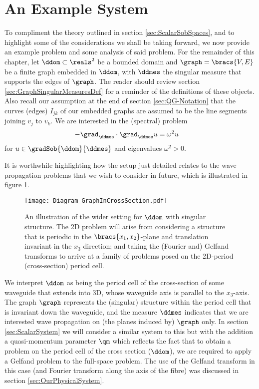 \section{An Example System} \label{sec:ScalarExample}
To compliment the theory outlined in section \ref{sec:ScalarSobSpaces}, and to highlight some of the considerations we shall be taking forward, we now provide an example problem and some analysis of said problem.
For the remainder of this chapter, let $\ddom\subset\reals^2$ be a bounded domain and $\graph = \bracs{V,E}$ be a finite graph embedded in $\ddom$, with $\ddmes$ the singular measure that supports the edges of $\graph$.
The reader should review section \ref{sec:GraphSingularMeasuresDef} for a reminder of the definitions of these objects.
Also recall our assumption at the end of section \ref{sec:QG-Notation} that the curves (edges) $I_{jk}$ of our embedded graphs are assumed to be the line segments joining $v_j$ to $v_k$.
We are interested in the (spectral) problem
\begin{align} \label{eq:ScalarExampleStrongForm}
	-\grad_\ddmes \cdot \grad_\ddmes u &= \omega^2 u
\end{align}
for $u\in\gradSob{\ddom}{\ddmes}$ and eigenvalues $\omega^2>0$. \newline

It is worthwhile highlighting how the setup just detailed relates to the wave propagation problems that we wish to consider in future, which is illustrated in figure \ref{fig:ScalarStrucDiagram}.
\begin{figure}[b!]
	\centering
	\texttt{[image: Diagram\_GraphInCrossSection.pdf]}
	\caption{\label{fig:ScalarStrucDiagram} An illustration of the wider setting for $\ddom$ with singular structure. The 2D problem will arise from considering a structure that is periodic in the $\bracs{x_1,x_2}$-plane and translation invariant in the $x_3$ direction; and taking the (Fourier and) Gelfand transforms to arrive at a family of problems posed on the 2D-period (cross-section) period cell.}
\end{figure}
We interpret $\ddom$ as being the period cell of the cross-section of some waveguide that extends into 3D, whose waveguide axis is parallel to the $x_3$-axis.
The graph $\graph$ represents the (singular) structure within the period cell that is invariant down the waveguide, and the measure $\ddmes$ indicates that we are interested wave propagation on (the planes induced by) $\graph$ only.
In section \ref{sec:ScalarSystem} we will consider a similar system to this but with the addition a quasi-momentum parameter $\qm$ which reflects the fact that to obtain a problem on the period cell of the cross section ($\ddom$), we are required to apply a Gelfand problem to the full-space problem.
The use of the Gelfand transform in this case (and Fourier transform along the axis of the fibre) was discussed in section \ref{sec:OurPhysicalSystem}. \newline

